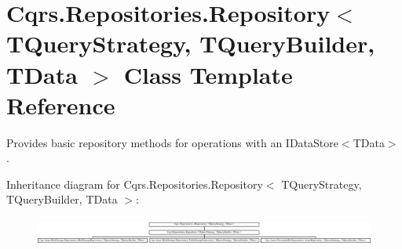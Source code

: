 \hypertarget{classCqrs_1_1Repositories_1_1Repository}{}\section{Cqrs.\+Repositories.\+Repository$<$ T\+Query\+Strategy, T\+Query\+Builder, T\+Data $>$ Class Template Reference}
\label{classCqrs_1_1Repositories_1_1Repository}


Provides basic repository methods for operations with an I\+Data\+Store$<$\+T\+Data$>$.  


Inheritance diagram for Cqrs.\+Repositories.\+Repository$<$ T\+Query\+Strategy, T\+Query\+Builder, T\+Data $>$\+:\begin{figure}[H]
\begin{center}
\leavevmode
\includegraphics[height=0.907618cm]{classCqrs_1_1Repositories_1_1Repository}
\end{center}
\end{figure}

